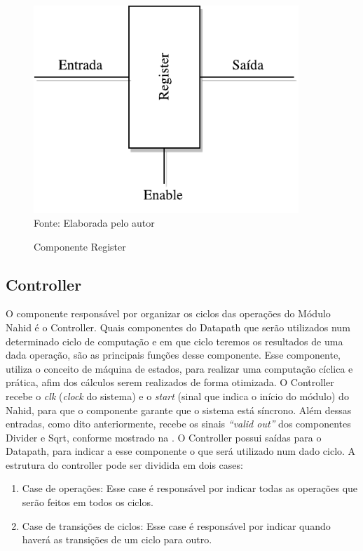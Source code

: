 \begin{figure}[H]
	\centering
	\caption{Componente Register}
	\includegraphics[width=10cm]{figures/Register.pdf}\\
	
	{Fonte: Elaborada pelo autor}
	\label{register}
\end{figure}

\subsection{Controller}
O componente responsável por organizar os ciclos das operações do Módulo Nahid é o Controller. Quais componentes do Datapath que serão utilizados num determinado ciclo de computação e em que ciclo teremos os resultados de uma dada operação, são as principais funções desse componente. Esse componente, utiliza o conceito de máquina de estados, para realizar uma computação cíclica e prática, afim dos cálculos serem realizados de forma otimizada. O Controller recebe o \textit{clk} (\textit{clock} do sistema) e o \textit{start} (sinal que indica o início do módulo) do Nahid, para que o componente garante que o sistema está síncrono. Além dessas entradas, como dito anteriormente, recebe os sinais \textit{“valid out”} dos componentes Divider e Sqrt, conforme mostrado na . O Controller possui saídas para o Datapath, para indicar a esse componente o que será utilizado num dado ciclo. A estrutura do controller pode ser dividida em dois cases:
\begin{enumerate}
	\item Case de operações: Esse case é responsável por indicar todas as operações que serão feitos em todos os ciclos. 
	\item Case de transições de ciclos: Esse case é responsável por indicar quando haverá as transições de um ciclo para outro.
\end{enumerate} 


